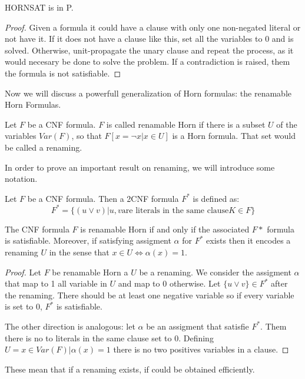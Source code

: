 \begin{proposition}
  HORNSAT is in P.
\end{proposition}
\begin{proof}
  Given a formula it could have a clause with only one non-negated literal or not have it. If it does not have a clause like this, set all the variables to 0 and is solved. Otherwise, unit-propagate the unary clause and repeat the process, as it would necesary be done to solve the problem. If a contradiction is raised, them the formula is not satisfiable.
\end{proof}


Now we will discuss a powerfull generalization of Horn formulas: the renamable Horn Formulas. 

\begin{definition}
  Let $F$ be a CNF formula. $F$ is called renamable Horn if there is a subset $U$ of the variables $Var(F)$, so that $F[x=\neg x | x \in U]$ is a Horn formula.
  That set would be called a renaming.
\end{definition}

In order to prove an important result on renaming, we will introduce some notation.

\begin{definition}
  Let $F$ be a CNF formula. Then a 2CNF formula $F^*$ is defined as:
  $$F^* = \{(u \vee v) | u,v \text{are literals in the same clause} K \in F \}$$
\end{definition}


\begin{theorem}
  The CNF formula $F$ is renamable Horn if and only if the associated $F*$ formula is satisfiable. Moreover, if satisfying assigment $\alpha$ for $F^*$  exists then it encodes a renaming $U$ in the sense that $x \in U \iff \alpha(x) = 1$.
\end{theorem}
\begin{proof}
  Let $F$ be renamable Horn a $U$ be a renaming. We consider the assigment $\alpha$ that map to 1 all variable in $U$ and map to 0 otherwise. Let $\{u\vee v\} \in F^*$ after the renaming. There should be at least one negative variable so if every variable is set to 0, $F^*$ is satisfiable.

  The other direction is analogous: let $\alpha$ be an assigment that satisfie $F^*$. Them there is no to literals in the same clause set to 0. Defining $U=  {x \in Var(F) | \alpha(x) = 1}$ there is no two positives variables in a clause.
  \end{proof}


These mean that if a renaming exists, if could be obtained efficiently.







